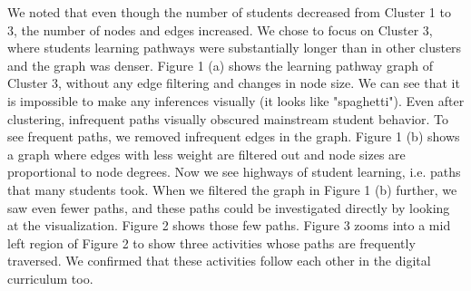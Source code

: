 \documentclass{edm_template}
\begin{document}
We noted that even though the number of students decreased from Cluster 1 to 3, the number of nodes and edges increased. We chose to focus on Cluster 3, where students learning pathways were substantially longer than in other clusters and the graph was denser. Figure 1 (a) shows the learning pathway graph of Cluster 3, without any edge filtering and changes in node size. We can see that it is impossible to make any inferences visually (it looks like "spaghetti"). Even after clustering, infrequent paths visually obscured mainstream student behavior. To see frequent paths, we removed infrequent edges in the graph. Figure 1 (b) shows a graph where edges with less weight are filtered out and node sizes are proportional to node degrees. Now we see highways of student learning, i.e. paths that many students took. When we filtered the graph in Figure 1 (b) further, we saw even fewer paths, and these paths could be investigated directly by looking at the visualization. Figure 2 shows those few paths. Figure 3 zooms into a mid left region of Figure 2 to show three activities whose paths are frequently traversed. We confirmed that these activities follow each other in the digital curriculum too.
\end{document}
